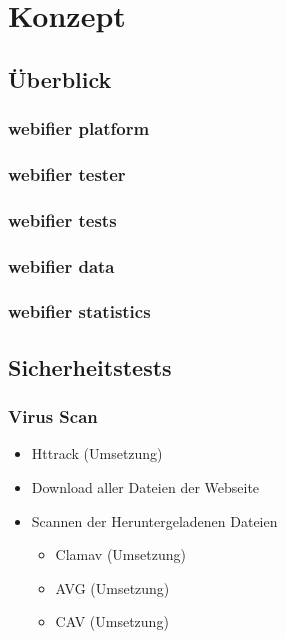 \chapter{Konzept}

\section{Überblick}

\subsection{webifier platform}

\subsection{webifier tester}

\subsection{webifier tests}

\subsection{webifier data}

\subsection{webifier statistics}

\section{Sicherheitstests}

\subsection{Virus Scan}
\begin{itemize}
  \item Httrack (Umsetzung)
  \item Download aller Dateien der Webseite
  \item Scannen der Heruntergeladenen Dateien
  \begin{itemize}
    \item Clamav (Umsetzung)
    \item AVG (Umsetzung)
    \item CAV (Umsetzung)
  \end{itemize}
\end{itemize}

